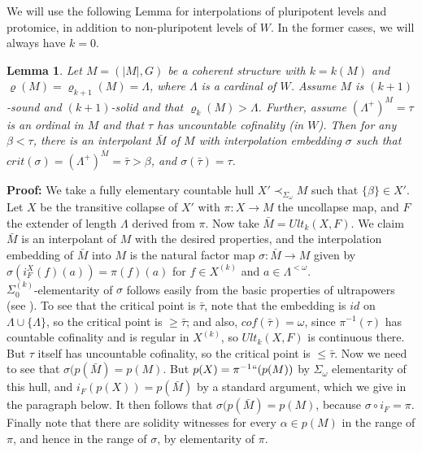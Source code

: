 \documentclass[12pt]{article}
\newtheorem{lem}[thm]{Lemma}
\begin{document}
We will use the following Lemma for interpolations of pluripotent levels and protomice, in addition to non-pluripotent levels of $W$.  In the former cases, we will always have $k = 0$.\\

\begin{lem} \label{cofinal interpolants}
Let $M = (|M| , G)$ be a coherent structure with $k = k(M)$ and $\varrho ( M) = \varrho_{k+1} (M) = \Lambda$, where $\Lambda$ is a cardinal of $W$.  Assume $M$ is $(k+1)$-sound and $(k+1)$-solid and that $\varrho_k (M) > \Lambda$.  Further, assume $(\Lambda^+ )^M = \tau$ is an ordinal in $M$ and that $\tau$ has uncountable cofinality (in $W$).  Then for any $\beta < \tau$, there is an interpolant $\bar{M}$ of $M$ with interpolation embedding $\sigma$ such that $crit(\sigma) = (\Lambda^+)^{\bar{M}}= \bar{\tau} > \beta$, and $\sigma ( \bar{\tau}) = \tau$.
\end{lem}

\textbf{Proof:}  We take a fully elementary countable hull $X' \prec_{\Sigma_\omega} M$ such that $\{ \beta \} \in X'$.  Let $X$ be the transitive collapse of $X'$ with $\pi: X \longrightarrow M$ the uncollapse map, and $F$ the extender of length $\Lambda$ derived from $\pi$.  Now take $\bar{M} = Ult_k (X , F )$.  We claim $\bar{M}$ is an interpolant of $M$ with the desired properties, and the interpolation embedding of $\bar{M}$ into $M$ is the natural factor map $\sigma: \bar{M} \longrightarrow M$ given by $ \sigma (i_F^X ( f) ( a )) = \pi (f)  (a)$ for $f \in X^{(k)}$ and $a \in \Lambda^{< \omega}$.\\

$\Sigma_0^{(k)}$-elementarity of $\sigma$ follows easily from the basic properties of ultrapowers (see \cite{ZS finestructure}). To see that the critical point is $\bar{\tau}$, note that the embedding is $id$ on $\Lambda \cup \{ \Lambda \}$, so the critical point is $\geq \bar{\tau}$; and also,  $cof(\bar{\tau}) =  \omega$, since $\pi^{-1} ( \tau)$ has countable cofinality and is regular in $X^{(k)}$, so $Ult_k (X , F )$ is continuous there.  But $\tau$ itself has uncountable cofinality, so the critical point is $\leq \bar{\tau}$.  Now we need to see that $\sigma (p (\bar{M}) = p (M)$.  But $p(X) = \pi^{-1}`` (p(M))$ by $\Sigma_\omega$ elementarity of this hull, and $i_F (p(X)) = p(\bar{M})$ by a standard argument, which we give in the paragraph below.  It then follows that $\sigma (p (\bar{M}) = p (M)$, because $\sigma \circ i_F = \pi$.  Finally note that there are solidity witnesses for every $\alpha \in p(M)$ in the range of $\pi$, and hence in the range of $\sigma$, by elementarity of $\pi$.\\ 
\end{document}
